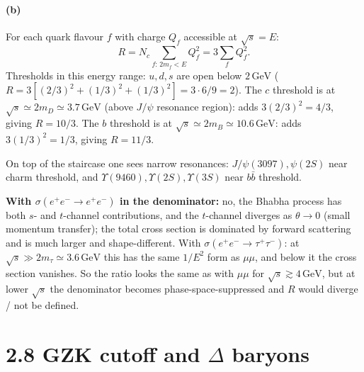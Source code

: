 \documentclass[11pt]{article}
\newcommand{\GeV}{\,\mathrm{GeV}}
\begin{document}
\paragraph{(b)} For each quark flavour $f$ with charge $Q_f$ accessible at $\sqrt{s}=E$:
\[
R = N_c\sum_{f:\,2m_f<E}Q_f^{2}=3\sum_{f}Q_f^{2}.
\]
Thresholds in this energy range: $u,d,s$ are open below $2\GeV$ ($R=3[(2/3)^{2}+(1/3)^{2}+(1/3)^{2}]=3\cdot 6/9=2$). The $c$ threshold is at $\sqrt{s}\simeq 2 m_D\simeq 3.7\GeV$ (above $J/\psi$ resonance region): adds $3(2/3)^{2}=4/3$, giving $R=10/3$. The $b$ threshold is at $\sqrt{s}\simeq 2 m_B\simeq 10.6\GeV$: adds $3(1/3)^{2}=1/3$, giving $R=11/3$.
\begin{center}
\end{center}
On top of the staircase one sees narrow resonances: $J/\psi(3097),\psi(2S)$ near charm threshold, and $\Upsilon(9460),\Upsilon(2S),\Upsilon(3S)$ near $b\bar b$ threshold.

\textbf{With $\sigma(e^+e^-\to e^+e^-)$ in the denominator:} no, the Bhabha process has both $s$- and $t$-channel contributions, and the $t$-channel diverges as $\theta\to 0$ (small momentum transfer); the total cross section is dominated by forward scattering and is much larger and shape-different. With $\sigma(e^+e^-\to\tau^+\tau^-)$: at $\sqrt{s}\gg 2 m_\tau\simeq 3.6\GeV$ this has the same $1/E^{2}$ form as $\mu\mu$, and below it the cross section vanishes. So the ratio looks the same as with $\mu\mu$ for $\sqrt{s}\gtrsim 4\GeV$, but at lower $\sqrt{s}$ the denominator becomes phase-space-suppressed and $R$ would diverge / not be defined.

\section*{2.8 \quad GZK cutoff and $\Delta$ baryons}
\end{document}
